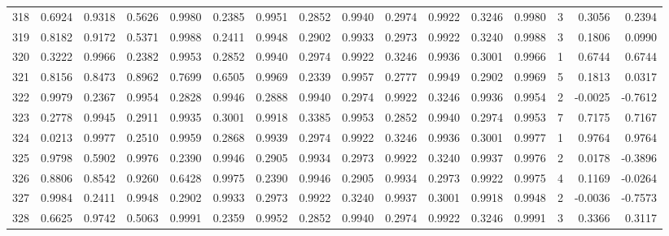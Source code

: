 \begin{tabular}{lrrrrrrrrrrrrrrr}
318 &      0.6924 &  0.9318 &  0.5626 &  0.9980 &  0.2385 &  0.9951 &  0.2852 &  0.9940 &  0.2974 &  0.9922 &   0.3246 &     0.9980 &      3 &                    0.3056 &                     0.2394 \\
319 &      0.8182 &  0.9172 &  0.5371 &  0.9988 &  0.2411 &  0.9948 &  0.2902 &  0.9933 &  0.2973 &  0.9922 &   0.3240 &     0.9988 &      3 &                    0.1806 &                     0.0990 \\
320 &      0.3222 &  0.9966 &  0.2382 &  0.9953 &  0.2852 &  0.9940 &  0.2974 &  0.9922 &  0.3246 &  0.9936 &   0.3001 &     0.9966 &      1 &                    0.6744 &                     0.6744 \\
321 &      0.8156 &  0.8473 &  0.8962 &  0.7699 &  0.6505 &  0.9969 &  0.2339 &  0.9957 &  0.2777 &  0.9949 &   0.2902 &     0.9969 &      5 &                    0.1813 &                     0.0317 \\
322 &      0.9979 &  0.2367 &  0.9954 &  0.2828 &  0.9946 &  0.2888 &  0.9940 &  0.2974 &  0.9922 &  0.3246 &   0.9936 &     0.9954 &      2 &                   -0.0025 &                    -0.7612 \\
323 &      0.2778 &  0.9945 &  0.2911 &  0.9935 &  0.3001 &  0.9918 &  0.3385 &  0.9953 &  0.2852 &  0.9940 &   0.2974 &     0.9953 &      7 &                    0.7175 &                     0.7167 \\
324 &      0.0213 &  0.9977 &  0.2510 &  0.9959 &  0.2868 &  0.9939 &  0.2974 &  0.9922 &  0.3246 &  0.9936 &   0.3001 &     0.9977 &      1 &                    0.9764 &                     0.9764 \\
325 &      0.9798 &  0.5902 &  0.9976 &  0.2390 &  0.9946 &  0.2905 &  0.9934 &  0.2973 &  0.9922 &  0.3240 &   0.9937 &     0.9976 &      2 &                    0.0178 &                    -0.3896 \\
326 &      0.8806 &  0.8542 &  0.9260 &  0.6428 &  0.9975 &  0.2390 &  0.9946 &  0.2905 &  0.9934 &  0.2973 &   0.9922 &     0.9975 &      4 &                    0.1169 &                    -0.0264 \\
327 &      0.9984 &  0.2411 &  0.9948 &  0.2902 &  0.9933 &  0.2973 &  0.9922 &  0.3240 &  0.9937 &  0.3001 &   0.9918 &     0.9948 &      2 &                   -0.0036 &                    -0.7573 \\
328 &      0.6625 &  0.9742 &  0.5063 &  0.9991 &  0.2359 &  0.9952 &  0.2852 &  0.9940 &  0.2974 &  0.9922 &   0.3246 &     0.9991 &      3 &                    0.3366 &                     0.3117 \\

\end{tabular}
